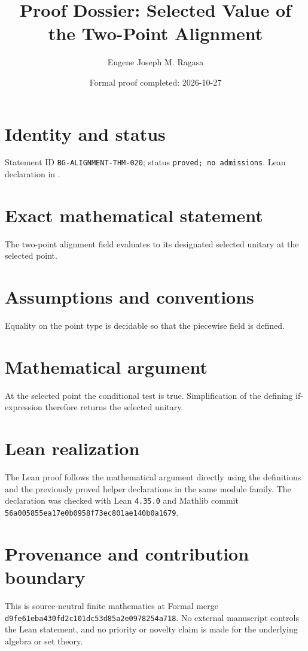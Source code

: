 \documentclass[11pt]{article}
\title{Proof Dossier: Selected Value of the Two-Point Alignment}
\author{Eugene Joseph M. Ragasa}
\date{Formal proof completed: 2026-10-27}
\begin{document}
\raggedright
\maketitle

\section{Identity and status}
Statement ID \texttt{BG-ALIGNMENT-THM-020}; status \texttt{proved; no admissions}.  Lean declaration
 in
.

\section{Exact mathematical statement}
The two-point alignment field evaluates to its designated selected unitary at the selected point.

\section{Assumptions and conventions}
Equality on the point type is decidable so that the piecewise field is defined.

\section{Mathematical argument}
At the selected point the conditional test is true.  Simplification of the defining if-expression therefore returns the selected unitary.

\section{Lean realization}
The Lean proof follows the mathematical argument directly using the definitions and the
previously proved helper declarations in the same module family.  The declaration was checked
with Lean \texttt{4.35.0} and Mathlib commit \texttt{56a005855ea17e0b0958f73ec801ae140b0a1679}.

\section{Provenance and contribution boundary}
This is source-neutral finite mathematics at Formal merge
\texttt{d9fe61eba430fd2c101dc53d85a2e0978254a718}.  No external manuscript controls the Lean statement, and no priority or
novelty claim is made for the underlying algebra or set theory.
\end{document}
